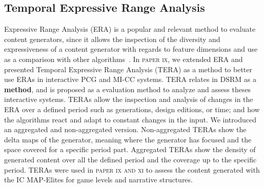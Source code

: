 \subsection{Temporal Expressive Range Analysis}


Expressive Range Analysis (ERA) is a popular and relevant method to evaluate content generators, since it allows the inspection of the diversity and expressiveness of a content generator with regards to feature dimensions and use as a comparison with other algorithms~\cite{shaker_procedural_2016,cook_danesh_2016,horn_comparative_2014}. In \textsc{paper ix}, we extended ERA and presented Temporal Expressive Range Analysis (TERA) as a method to better use ERAs in interactive PCG and MI-CC systems. TERA relates in DSRM as a \textbf{method}, and is proposed as a evaluation method to analyze and assess theses interactive systems. TERAs allow the inspection and analysis of changes in the ERA over a defined period such as generations, design editions, or time; and how the algorithms react and adapt to constant changes in the input. We introduced an aggregated and non-aggregated version. Non-aggregated TERAs show the delta maps of the generator, meaning where the generator has focused and the space covered for a specific period part. Aggregated TERAs show the density of generated content over all the defined period and the coverage up to the specific period. TERAs were used in \textsc{paper ix and xi} to assess the content generated with the IC MAP-Elites for game levels and narrative structures. 



